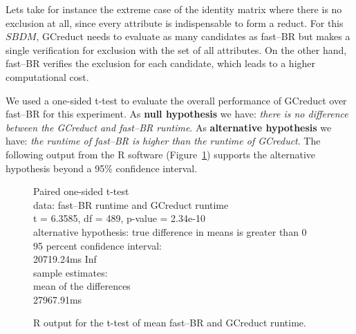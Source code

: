 \documentclass[authoryear,preprint,review,12pt]{elsarticle}
\begin{document}
	
	Lets take for instance the extreme case of the identity matrix where there is no exclusion at all, since every attribute is indispensable to form a reduct. For this $SBDM$, GCreduct needs to evaluate as many candidates as fast--BR but makes a single verification for exclusion with the set of all attributes. On the other hand, fast--BR verifies the exclusion for each candidate, which leads to a higher computational cost.
	
	We used a one-sided t-test to evaluate the overall performance of GCreduct over fast--BR for this experiment. As \textbf{null hypothesis} we have: \emph{there is no difference between the GCreduct and fast--BR runtime}. As \textbf{alternative hypothesis} we have: \emph{the runtime of fast--BR is higher than the runtime of GCreduct}. The following output from the R software (Figure~\ref{fig:R_fast--BRvsGCreduct}) supports the alternative	hypothesis beyond a 95\% confidence interval.
	
	\begin{figure}
		\qquad{}	Paired one-sided t-test\\

		data:  fast--BR runtime and GCreduct runtime\\
		t = 6.3585, df = 489, p-value = 2.34e-10\\
		alternative hypothesis: true difference in means is greater than 0\\
		95 percent confidence interval:\\
		 20719.24ms  \qquad{}  Inf\\
		sample estimates:\\
		mean of the differences \\
		 \qquad{}    27967.91ms
		 		 
		\centering
	  	\caption{R output for the t-test of mean fast--BR and GCreduct runtime.}
	  	\label{fig:R_fast--BRvsGCreduct}
	\end{figure}
	
\end{document}
